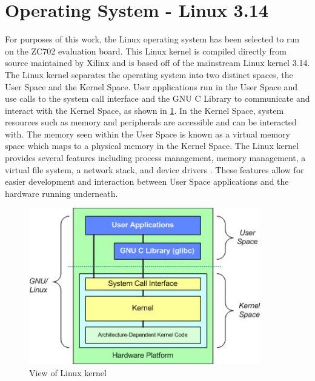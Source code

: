 \section{Operating System - Linux 3.14}

For purposes of this work, the Linux operating system has been selected to run on the ZC702 evaluation board.  This Linux kernel is compiled directly from source maintained by Xilinx and is based off of the mainstream Linux kernel 3.14.  The Linux kernel separates the operating system into two distinct spaces, the User Space and the Kernel Space.  User applications run in the User Space and use calls to the system call interface and the GNU C Library to communicate and interact with the Kernel Space, as shown in \ref{fig:linux_kernel}.  In the Kernel Space, system resources such as memory and peripherals are accessible and can be interacted with.  The memory seen within the User Space is known as a virtual memory space which maps to a physical memory in the Kernel Space.  The Linux kernel provides several features including process management, memory management, a virtual file system, a network stack, and device drivers \cite{ibm_linux_kernel}.  These features allow for easier development and interaction between User Space applications and the hardware running underneath.

\begin{figure}[!h]
  \centering
  \includegraphics[width=0.9\textwidth]{./img/linux_kernel.png}
  \caption{View of Linux kernel}
  \label{fig:linux_kernel}
\end{figure}

